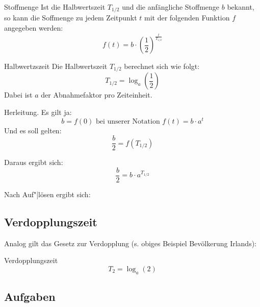 \begin{gesetz}{Stoffmenge}{}
  Ist die Halbwertszeit $T_{1/2}$ und die anfängliche Stoffmenge $b$
  bekannt, so kann die Soffmenge zu jedem Zeitpunkt $t$ mit der
  folgenden Funktion $f$ angegeben werden:
  $$f(t) = b\cdot{}\left(\frac12\right)^\frac{t}{T_{1/2}}$$
\end{gesetz}
  
\begin{gesetz}{Halbwertzszeit}{}
  Die Halbwertszeit $T_{1/2}$ berechnet sich wie folgt:
  $$T_{1/2} = \log_a\left(\frac12\right)$$
  Dabei ist $a$ der Abnahmefaktor pro Zeiteinheit.
\end{gesetz}



  Herleitung. Es gilt ja:
  $$b=f(0) \text{ bei unserer Notation } f(t) = b\cdot{}a^t$$
  Und es soll gelten:
  $$\frac{b}2 = f(T_{1/2})$$

  Daraus ergibt sich:
  $$\frac{b}2 = b\cdot{}a^{T_{1/2}}$$

    Nach Auf"|lösen ergibt sich:


\newpage
{}

\subsection{Verdopplungszeit}

Analog gilt das Gesetz zur Verdopplung (s. obiges Beispiel Bevölkerung Irlands):
\begin{gesetz}{Verdopplungszeit}{}
  $$T_2 = \log_a(2)$$
\end{gesetz}


\subsection*{Aufgaben}



